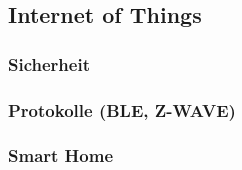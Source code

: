 \subsection{Internet of Things}
\label{sec:sota_iot}
\subsubsection{Sicherheit}
\label{sec:sota_iot_security}
\subsubsection{Protokolle (BLE, Z-WAVE)}
\label{sec:sota_iot_protocols}
\subsubsection{Smart Home}
\label{sec:sota_iot_smart_home}